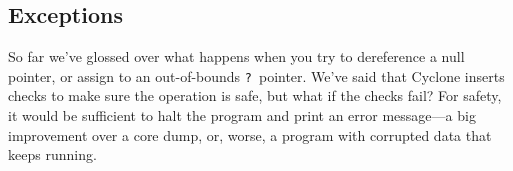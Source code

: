 

\subsection{Exceptions}

So far we've glossed over what happens when you try to dereference a
null pointer, or assign to an out-of-bounds \texttt{?}\ pointer.
We've said that Cyclone inserts checks to make sure the operation is
safe, but what if the checks fail?  For safety, it would be sufficient
to halt the program and print an error message---a big improvement
over a core dump, or, worse, a program with corrupted data that keeps
running.

